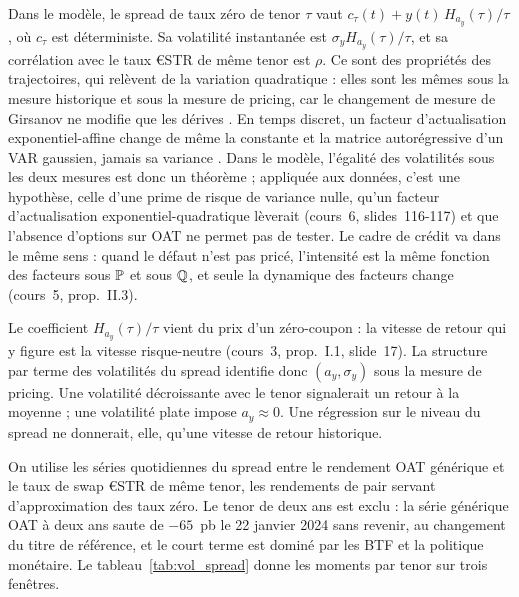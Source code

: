 Dans le modèle, le spread de taux zéro de tenor $\tau$ vaut $c_\tau(t) + y(t)\,H_{a_y}(\tau)/\tau$, où $c_\tau$ est
déterministe. Sa volatilité instantanée est $\sigma_y H_{a_y}(\tau)/\tau$, et sa corrélation avec le taux €STR de
même tenor est $\rho$. Ce sont des propriétés des trajectoires, qui relèvent de la variation quadratique : elles
sont les mêmes sous la mesure historique et sous la mesure de pricing, car le changement de mesure de Girsanov ne
modifie que les dérives \citep[CM3, p.~5-6]{Hillairet2026}. En temps discret, un facteur d'actualisation
exponentiel-affine change de même la constante et la matrice autorégressive d'un VAR gaussien, jamais sa variance
\citep[cours~3, prop.~I.3, slides~24-25]{MPR2025}. Dans le modèle, l'égalité des volatilités sous les deux mesures
est donc un théorème ; appliquée aux données, c'est une hypothèse, celle d'une prime de risque de variance nulle,
qu'un facteur d'actualisation exponentiel-quadratique lèverait (cours~6, slides~116-117) et que l'absence d'options
sur OAT ne permet pas de tester. Le cadre de crédit va dans le même sens : quand le défaut n'est pas pricé,
l'intensité est la même fonction des facteurs sous $\P$ et sous $\Q$, et seule la dynamique des facteurs change
(cours~5, prop.~II.3).

Le coefficient $H_{a_y}(\tau)/\tau$ vient du prix d'un zéro-coupon : la vitesse de retour qui y figure est la
vitesse risque-neutre (cours~3, prop.~I.1, slide~17). La structure par terme des volatilités du spread identifie
donc $(a_y, \sigma_y)$ sous la mesure de pricing. Une volatilité décroissante avec le tenor signalerait un retour à
la moyenne ; une volatilité plate impose $a_y \approx 0$. Une régression sur le niveau du spread ne donnerait, elle,
qu'une vitesse de retour historique.

On utilise les séries quotidiennes du spread entre le rendement OAT générique et le taux de swap €STR de même
tenor, les rendements de pair servant d'approximation des taux zéro. Le tenor de deux ans est exclu : la série
générique OAT à deux ans saute de $-65$~pb le 22 janvier 2024 sans revenir, au changement du titre de référence, et
le court terme est dominé par les BTF et la politique monétaire. Le tableau~\ref{tab:vol_spread} donne les moments
par tenor sur trois fenêtres.

